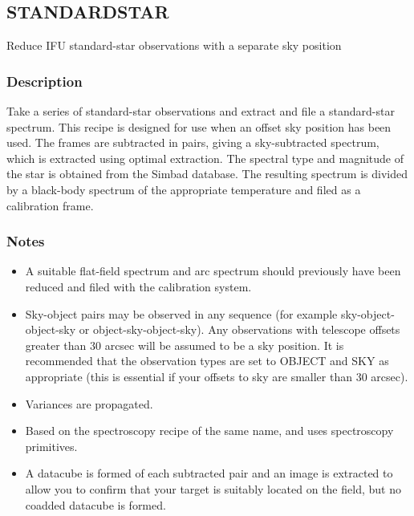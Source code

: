 \documentclass[twoside,11pt]{article}
\renewcommand{\_}{\texttt{\symbol{95}}}
\begin{document}
\clearpage



\subsection{STANDARD\_STAR}

Reduce IFU standard-star observations with a separate sky position

\subsubsection*{Description}

Take a series of standard-star observations and extract and file a
standard-star spectrum. This recipe is designed for use when an offset
sky position has been used. The frames are subtracted in pairs, giving
a sky-subtracted spectrum, which is extracted using optimal
extraction. The spectral type and magnitude of the star is obtained
from the Simbad database. The resulting spectrum is divided by a
black-body spectrum of the appropriate temperature and filed as a
calibration frame.

\subsubsection*{Notes}\begin{itemize}

\item 
  
  A suitable flat-field spectrum and arc spectrum should previously
  have been reduced and filed with the calibration system.

\item
  
  Sky-object pairs may be observed in any sequence (for example
  sky-object-object-sky or object-sky-object-sky). Any observations
  with telescope offsets greater than 30 arcsec will be assumed to be
  a sky position. It is recommended that the observation types are set
  to OBJECT and SKY as appropriate (this is essential if your offsets
  to sky are smaller than 30 arcsec).

\item

  Variances are propagated.

\item 
  
  Based on the spectroscopy recipe of the same name, and uses
  spectroscopy primitives.

\item 

A datacube is formed of each subtracted pair and an image is extracted
to allow you to confirm that your target is suitably located on the
field, but no coadded datacube is formed.

\end{itemize}
\end{document}

